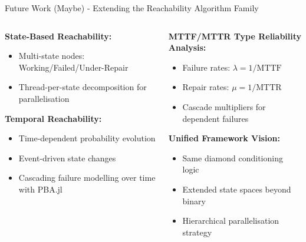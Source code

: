 \documentclass[aspectratio=169]{beamer}
\begin{document}
\begin{frame}{\textcolor{juliapurple}{Future Work (Maybe) - Extending the Reachability Algorithm Family}}
\begin{columns}
\begin{column}{0.48\textwidth}
\textbf{\textcolor{juliagreen}{State-Based Reachability:}}
\begin{itemize}
    \item Multi-state nodes: Working/Failed/Under-Repair
    \item Thread-per-state decomposition for parallelisation
\end{itemize}

\vspace{0.3cm}
\textbf{\textcolor{juliablue}{Temporal Reachability:}}
\begin{itemize}
    \item Time-dependent probability evolution
    \item Event-driven state changes
    \item Cascading failure modelling over time with PBA.jl
\end{itemize}
\end{column}

\begin{column}{0.48\textwidth}
\textbf{\textcolor{juliared}{MTTF/MTTR Type Reliability Analysis:}}
\begin{itemize}
    \item Failure rates: $\lambda = 1/\text{MTTF}$
    \item Repair rates: $\mu = 1/\text{MTTR}$
    \item Cascade multipliers for dependent failures
\end{itemize}

\vspace{0.3cm}
\textbf{\textcolor{juliapurple}{Unified Framework Vision:}}
\begin{itemize}
    \item Same diamond conditioning logic
    \item Extended state spaces beyond binary
    \item Hierarchical parallelisation strategy
\end{itemize}
\end{column}
\end{columns}

\end{frame}
\end{document}
